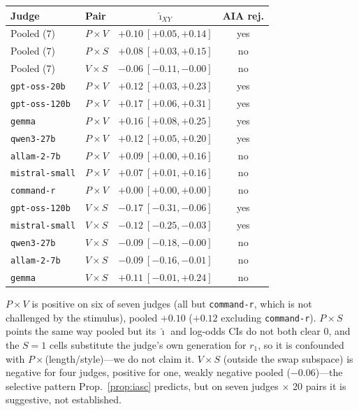 \documentclass{article}
\begin{document}
\begin{center}\small
\begin{tabular}{llcc}
\toprule
Judge & Pair & $\hat\imath_{XY}$ & AIA rej. \\
\midrule
Pooled ($7$) & $P{\times}V$ & $+0.10\ [+0.05,+0.14]$ & yes \\
Pooled ($7$) & $P{\times}S$ & $+0.08\ [+0.03,+0.15]$ & no  \\
Pooled ($7$) & $V{\times}S$ & $-0.06\ [-0.11,-0.00]$ & no  \\
\midrule
\texttt{gpt-oss-20b}  & $P{\times}V$ & $+0.12\ [+0.03,+0.23]$ & yes \\
\texttt{gpt-oss-120b} & $P{\times}V$ & $+0.17\ [+0.06,+0.31]$ & yes \\
\texttt{gemma}        & $P{\times}V$ & $+0.16\ [+0.08,+0.25]$ & yes \\
\texttt{qwen3-27b}    & $P{\times}V$ & $+0.12\ [+0.05,+0.20]$ & yes \\
\texttt{allam-2-7b}   & $P{\times}V$ & $+0.09\ [+0.00,+0.16]$ & no  \\
\texttt{mistral-small}& $P{\times}V$ & $+0.07\ [+0.01,+0.16]$ & no  \\
\texttt{command-r}    & $P{\times}V$ & $+0.00\ [+0.00,+0.00]$ & no  \\
\midrule
\texttt{gpt-oss-120b} & $V{\times}S$ & $-0.17\ [-0.31,-0.06]$ & yes \\
\texttt{mistral-small}& $V{\times}S$ & $-0.12\ [-0.25,-0.03]$ & yes \\
\texttt{qwen3-27b}    & $V{\times}S$ & $-0.09\ [-0.18,-0.00]$ & no  \\
\texttt{allam-2-7b}   & $V{\times}S$ & $-0.09\ [-0.16,-0.01]$ & no  \\
\texttt{gemma}        & $V{\times}S$ & $+0.11\ [-0.01,+0.24]$ & no  \\
\bottomrule
\end{tabular}
\end{center}

\noindent $P{\times}V$ is positive on six of seven judges (all but
\texttt{command-r}, which is not challenged by the stimulus), pooled
$+0.10$ ($+0.12$ excluding \texttt{command-r}). $P{\times}S$ points
the same way pooled but its $\hat\imath$ and log-odds CIs do not
both clear 0, and the $S{=}1$ cells substitute the judge's own
generation for $r_1$, so it is confounded with
$P{\times}$(length/style)---we do not claim it. $V{\times}S$
(outside the swap subspace) is negative for four judges, positive
for one, weakly negative pooled ($-0.06$)---the selective pattern
Prop.~\ref{prop:iasc} predicts, but on seven judges $\times$ 20 pairs
it is suggestive, not established.
\end{document}
